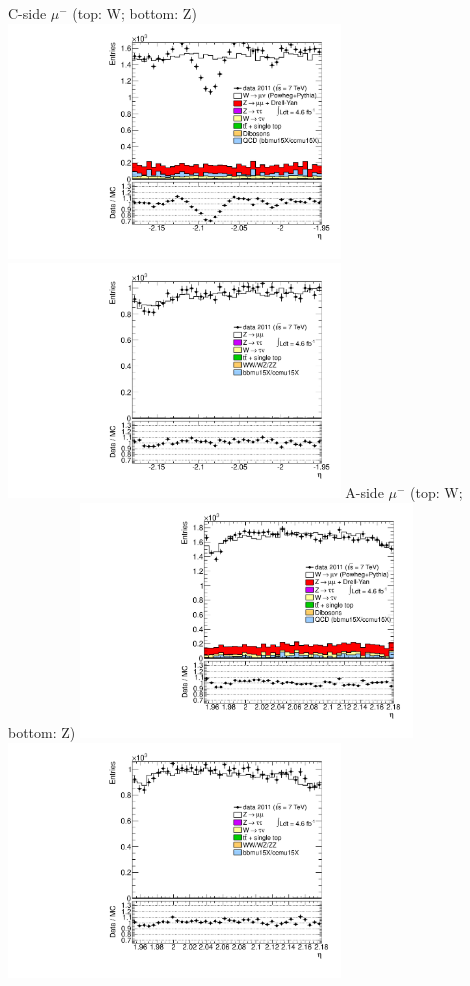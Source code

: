  {
\colb[T]
C-side $\mu^{-}$ (top: W; bottom: Z)
\centering
\includegraphics[width=0.66\textwidth]{dates/20130306/figures/both/WpMtoM_10_C_stack_l_eta_NEG} \\
\includegraphics[width=0.66\textwidth]{dates/20130306/figures/both/Z_10_C_stack_lN_eta_ALL.pdf}
A-side $\mu^{-}$ (top: W; bottom: Z)
\centering
\includegraphics[width=0.66\textwidth]{dates/20130306/figures/both/WpMtoM_10_A_stack_l_eta_NEG} \\
\includegraphics[width=0.66\textwidth]{dates/20130306/figures/both/Z_10_A_stack_lN_eta_ALL.pdf} 
\cole
}


